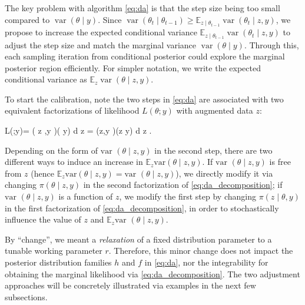 \documentclass[10pt]{article}
\newcommand{\be}{\begin{equs}}
\newcommand{\ee}{\end{equs}}
\newcommand{\bb}[1]{\mathbb{#1}}
\DeclareMathOperator{\var}{var}
\begin{document}
 
The key problem with algorithm \eqref{eq:da} is that the step size being too small compared to $\var(\theta \mid y)$. Since $\var(\theta_{t} \mid \theta_{t-1}) \ge \bb E_{z\mid \theta_{t-1} } \var(\theta_{t} \mid z,y) $, we propose to increase the expected conditional variance $\bb E_{z\mid \theta_{t-1} } \var(\theta_{t} \mid z,y) $  to adjust the step size and match the marginal variance $\var(\theta \mid y)$. Through this, each sampling iteration from conditional posterior could explore the marginal posterior region efficiently. For simpler notation, we write the expected conditional variance as $\bb E_{z} \var(\theta \mid z,y) $.

To start the calibration, note the two steps in \eqref{eq:da} are associated with two equivalent factorizations of likelihood $L(\theta;y)$ with augmented data $z$:

 \be \label{eq:da_decomposition}
 L(\theta;y)= \int \pi\left( z \mid \theta,y \right)\pi( \theta \mid y) d z  =  \int \pi\left(\theta \mid z,y \right)\pi(z \mid y) d z .
 \ee

Depending on the form of $\mbox{var } (\theta \mid z,y)$ in the second step, there are two different ways to induce an increase in $\bb E_z \text{var}(\theta \mid z, y)$. If $\mbox{var } (\theta \mid z,y)$ is free from $z$ (hence $\bb E_z \text{var}(\theta \mid z, y) = \mbox{var } (\theta \mid z,y)$), we directly modify it via changing $\pi\left(\theta \mid z,y \right)$ in the second factorization of \eqref{eq:da_decomposition}; if $\mbox{var } (\theta \mid z,y)$ is a function of $z$, we modify the first step by changing $\pi\left( z \mid \theta,y \right)$ in the first factorization of \eqref{eq:da_decomposition}, in order to stochastically influence the value of $z$ and $\mathbb{E}_z \mbox{var } (\theta \mid z,y)$.

By ``change'', we meant a {\it relaxation} of a fixed distribution parameter to a tunable working parameter $r$. Therefore, this minor change does not impact the posterior distribution families $h$ and $f$ in \eqref{eq:da}, nor the integrability for obtaining the marginal likelihood via \eqref{eq:da_decomposition}. The two adjustment approaches will be concretely illustrated via examples in the next few subsections.
\end{document}
